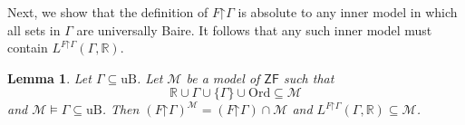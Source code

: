 \documentclass[fleqn, 11pt]{amsart}
\theoremstyle{plain}
\newtheorem{lem}[thm]{Lemma} \newtheorem*{lem*}{Lemma}
\theoremstyle{definition}
\theoremstyle{remark}
\newcommand{\Ord}{\mathrm{Ord}}
\newcommand{\uB}{\mathrm{uB}}
\newcommand{\Col}{\mathrm{Col}}
\newcommand{\restrict}{\mathord{\restriction}}
\begin{document}









Next, we show that the definition of $F \restrict \Gamma$ is absolute to 
any inner model in which all sets in $\Gamma$ are universally Baire. It follows that any such inner model must contain $L^{F \restrict \Gamma}(\Gamma, \mathbb{R})$. 

\begin{lem}\label{Fabslem}
 Let $\Gamma \subseteq \uB$.
 Let $\mathcal{M}$ be a model of $\mathsf{ZF}$ such that \[\mathbb{R} \cup \Gamma \cup \{\Gamma\} \cup \Ord \subseteq \mathcal{M}\] and $\mathcal{M} \models \Gamma \subseteq \uB$.
 Then $(F \restrict \Gamma)^\mathcal{M} = (F \restrict \Gamma) \cap \mathcal{M}$ and $L^{F \restrict \Gamma}(\Gamma, \mathbb{R}) \subseteq \mathcal{M}$.
\end{lem}
\end{document}
